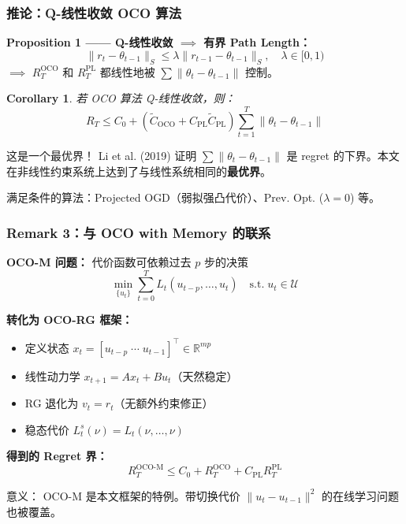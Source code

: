 \documentclass{ltx-talk}
\newtheorem*{corollary}{Corollary}
\begin{document}
\begin{frame}
\frametitle{推论：Q-线性收敛 OCO 算法}

\textbf{Proposition 1 —— Q-线性收敛 $\implies$ 有界 Path Length：}
\[
    \|r_t - \theta_{t-1}\|_S \le \lambda \|r_{t-1} - \theta_{t-1}\|_S, \quad \lambda \in [0,1)
\]
$\implies$ $R_T^{\text{OCO}}$ 和 $R_T^{\text{PL}}$ 都线性地被 $\sum \|\theta_t - \theta_{t-1}\|$ 控制。

\begin{corollary}
若 OCO 算法 Q-线性收敛，则：
\[
    \boxed{R_T \le C_0 + (\tilde{C}_{\text{OCO}} + C_{\text{PL}}\tilde{C}_{\text{PL}})\sum_{t=1}^{T} \|\theta_t - \theta_{t-1}\|}
\]
\end{corollary}

\small
\textcolor{myblue}{这是一个最优界！} Li et al. (2019) 证明 $\sum \|\theta_t - \theta_{t-1}\|$ 是 regret 的下界。本文在\textcolor{myred}{非线性约束系统}上达到了与线性系统相同的\textbf{最优界}。

\vspace{2mm}
满足条件的算法：Projected OGD（弱拟强凸代价）、Prev. Opt. ($\lambda=0$) 等。
\end{frame}

\begin{frame}
\frametitle{Remark 3：与 OCO with Memory 的联系}

\textbf{OCO-M 问题：} 代价函数可依赖过去 $p$ 步的决策
\[
    \min_{\{u_t\}} \sum_{t=0}^{T} L_t(u_{t-p}, \dots, u_t) \quad \text{s.t.} \; u_t \in \mathcal{U}
\]

\textbf{转化为 OCO-RG 框架：}
\begin{itemize}
    \item 定义状态 $x_t = [u_{t-p} \; \cdots \; u_{t-1}]^\top \in \mathbb{R}^{mp}$
    \item 线性动力学 $x_{t+1} = A x_t + B u_t$（\textcolor{myblue}{天然稳定}）
    \item RG 退化为 $v_t = r_t$（无额外约束修正）
    \item 稳态代价 $L_t^s(\nu) = L_t(\nu, \dots, \nu)$
\end{itemize}

\textbf{得到的 Regret 界：}
\[
    R_T^{\text{OCO-M}} \le C_0 + R_T^{\text{OCO}} + C_{\text{PL}} R_T^{\text{PL}}
\]

\small
\textcolor{myblue}{意义：} OCO-M 是本文框架的特例。带切换代价 $\|u_t - u_{t-1}\|^2$ 的在线学习问题也被覆盖。
\end{frame}
\end{document}
